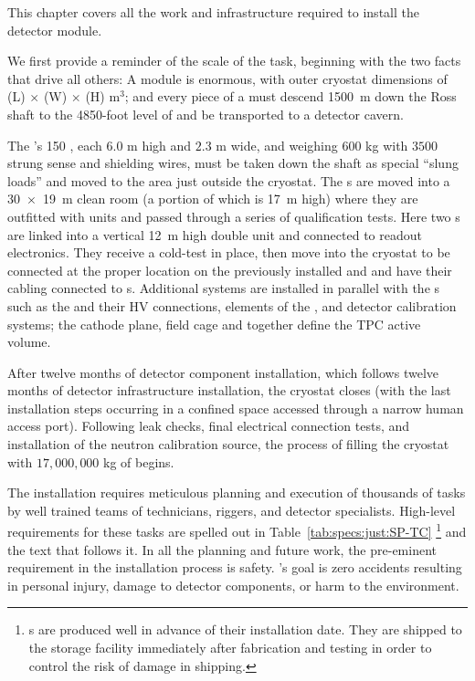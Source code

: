 
This chapter covers all the work and infrastructure required to install the  detector module. 
 
We first provide a reminder of the scale of the task, beginning with the two facts that drive all others: A   module is enormous, with outer cryostat dimensions  of 
\cryostatlen{}(L) $\times$ \cryostatwdth{}(W) $\times$ \cryostatht{}(H) m$^{3}$; 
and every piece of a  must descend 
\SI{1500}{m} down the Ross shaft to the 4850-foot level of  and be transported to a detector cavern.


The 's 150 , each $6.0$ m high and $2.3$ m wide, and  weighing $600$ kg with $3500$ strung sense and shielding wires, must be taken down the shaft as special ``slung loads'' and moved to the area just outside the  cryostat. 
The s are moved into a \SI{30 x 19}{m} clean room (a portion of which is \SI{17}{m} high) where they are outfitted  with  units and passed through a series of qualification tests.
Here two s are linked into a vertical \SI{12}{m} high double unit and connected to readout electronics. 
They receive a cold-test in place, then move into the cryostat to be connected at the proper location on the previously installed  and and have their cabling connected to \fdth{}s. 
Additional systems are installed in parallel with the s such as the  and their HV connections, elements of the , and detector calibration systems; the cathode plane, field cage and  together define the TPC active volume.


After twelve months of detector component installation, which follows twelve months of detector infrastructure installation, the cryostat closes (with the last installation steps occurring in a confined space accessed through a narrow human access port). 
Following leak checks, final electrical connection tests, and installation of the neutron calibration source, the process of filling the cryostat with $17,000,000$ kg of  begins.

The installation requires meticulous planning and execution of thousands of tasks by well trained teams of technicians, riggers, and detector specialists. 
High-level requirements for these tasks are spelled out in Table~\ref{tab:specs:just:SP-TC}
\footnote{s are produced well in advance of their installation date. They are shipped to the storage facility immediately after fabrication and testing in order to control the risk of damage in shipping.} 
and the text that follows it. 
In all the planning and future work, the pre-eminent requirement in the installation process is safety.
's goal is zero accidents resulting in personal injury, damage to detector components, or harm to the environment.


